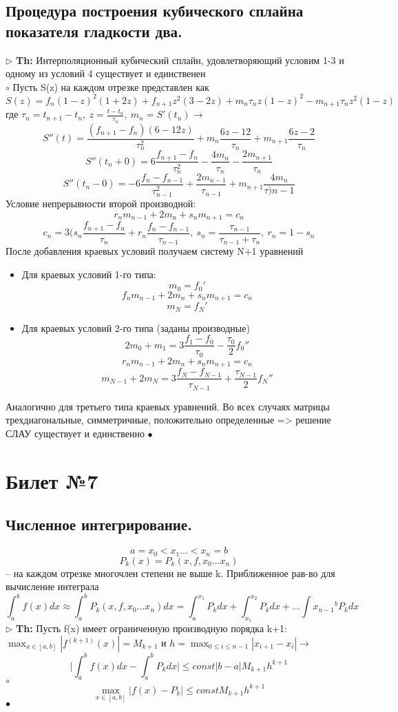 \documentclass[a4paper]{article}
\begin{document}
\subsection{Процедура построения кубического сплайна показателя гладкости два.}
$\triangleright$ \textbf{Th:} Интерполяционный кубический сплайн, удовлетворяющий условим 1-3 и одному из условий 4 существует и единственен\\
	$\circ$ 
	Пусть S(z) на каждом отрезке представлен как 
	$$ S(z) = f_n(1-z)^2(1+2z) +f_{n+1}z^2(3-2z) + m_n\tau_nz(1-z)^2 -m_{n+1}\tau_nz^2(1-z)$$
	где $\tau_n = t_{n+1}-t_n, \ z = \frac{t-t_n}{\tau_n}, \ m_n = S'(t_n) \rightarrow$
	$$ S''(t) = \frac{(f_{n+1} - f_n)(6-12z)}{\tau_n^2} + m_n \frac{6z-12}{\tau_n} + m_{n+1} \frac{6z-2}{\tau_n}$$
	$$ S''(t_n+0) = 6 \frac{f_{n+1}-f_n}{\tau_n^2} - \frac{4m_n}{\tau_n} - \frac{2m_{n+1}}{\tau_n}$$
	$$ S''(t_n-0) = -6 \frac{f_n-f_{n-1}}{\tau_{n-1}^2} + \frac{2m_{n-1}}{\tau_{n-1}} + m_{n+1}\frac{4m_n}{\tau){n-1}}$$
	Условие непрерывности второй производной:
	$$r_nm_{n-1}+2m_n+s_nm_{n+1}=c_n$$
	$$ c_n=3 \big(s_n\frac{f_{n+1}-f_n}{\tau_n}+r_n\frac{f_n-f_{n-1}}{\tau_{n-1}}, \ s_n=\frac{\tau_{n-1}}{\tau_{n-1}+\tau_n},\ r_n=1-s_n$$
	После добавления краевых условий получаем систему N+1 уравнений
	\begin{itemize}
		\item Для краевых условий 1-го типа:
		$$ m_0=f_0'$$
		$$ f_nm_{n-1} + 2m_n + s_nm_{n+1} = c_n$$
		$$ m_N=f_N'$$
		\item Для краевых условий 2-го типа (заданы производные)
		$$ 2m_0 + m_1 = 3\frac{f_1-f_0}{\tau_0} - \frac{\tau_0}{2}f_0'' $$
		$$ r_nm_{n-1} + 2m_n + s_nm_{n+1} = c_n $$
		$$ m_{N-1} + 2m_N = 3\frac{f_N-f_{N-1}}{\tau_{N-1}} + \frac{\tau_{N-1}}{2}f_N'' $$
	\end{itemize}
	Аналогично для третьего типа краевых уравнений. Во всех случаях матрицы трехдиагональные, симметричные, положительно определенные => решение СЛАУ существует и единственно
	$\bullet$

\section{Билет №7}
\subsection{Численное интегрирование.}
$$a=x_0<x_1\ldots <x_n=b$$
$$P_k(x)=P_k(x,f,x_0 \ldots x_n)$$ – на каждом отрезке многочлен степени не выше k. Приближенное рав-во для вычисление интеграла
$$ \int_{a}^b f(x)dx \approx \int_{a}^b P_k(x,f,x_0 \ldots x_n) dx = \int_{a}^{x_1} P_k dx + \int_{x_1}^{x_2} P_k dx + \ldots \int{x_{n-1}}^b P_k dx$$
$\triangleright$ \textbf{Th:} Пусть f(x) имеет ограниченную производную порядка k+1: $\max_{x\in [a,b]} |f^{(k+1)}(x)|=M_{k+1}$ и $h=\max_{0 \leq i \leq n-1} |x_{i+1} - x_i| \rightarrow$
$$ \big| \int_{a}^b f(x)dx - \int_{a}^b P_k dx \big| \leq const |b-a|M_{k+1}h^{k+1}$$
	$\circ$ 
		$$\max_{x \in [a,b]} |f(x)-P_k| \leq const M_{k+1}h^{k+1} $$
	$\bullet$ 
\end{document}
